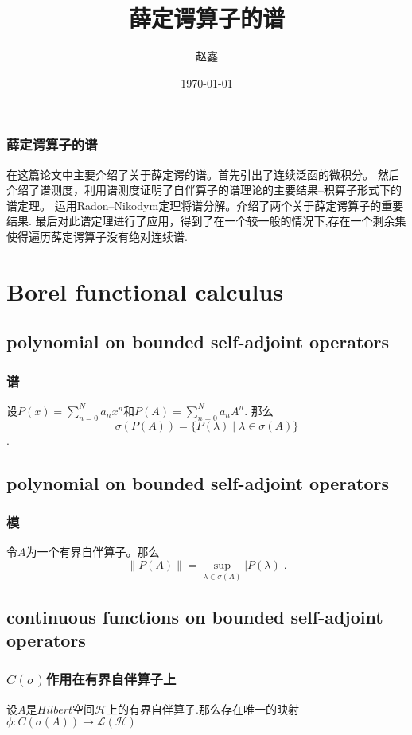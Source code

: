 \documentclass[compress,mathserif,red]{beamer}
\begin{document}
\title{薛定谔算子的谱}
\author{赵鑫}
\date{\today}



\frame{\titlepage}





\begin{frame}
\frametitle{薛定谔算子的谱}
在这篇论文中主要介绍了关于薛定谔的谱。首先引出了连续泛函的微积分。
然后介绍了谱测度，利用谱测度证明了自伴算子的谱理论的主要结果--积算子形式下的谱定理。
运用Radon–Nikodym定理将谱分解。介绍了两个关于薛定谔算子的重要结果.
最后对此谱定理进行了应用，得到了在一个较一般的情况下,存在一个剩余集使得遍历薛定谔算子没有绝对连续谱.
\end{frame}
\section{Borel functional calculus}
\subsection{polynomial on bounded self-adjoint operators}
\begin{frame}
\frametitle{谱}
\begin{corollary}
设$P(x)=\sum_{n=0}^N {a_n
x^n}$和$P(A)=\sum_{n=0}^N {a_n
 A^n}$. 那么
 $$\sigma(P(A))=\{P(\lambda) \mid \lambda \in
 \sigma(A)\}$$.
\end{corollary}
\end{frame}



\subsection{polynomial on bounded self-adjoint operators}
\begin{frame}
\frametitle{模}
\begin{corollary}
令$A$为一个有界自伴算子。那么$$\| P(A)
 \|=\sup_{\lambda \in \sigma(A)}\left| P(\lambda) \right|.$$
\end{corollary}
\end{frame}




\subsection{continuous functions on bounded self-adjoint operators}
\begin{frame}
\frametitle{$C(\sigma)$作用在有界自伴算子上}
\begin{theorem}
设$A$是$Hilbert$空间$\mathcal{H}$上的有界自伴算子.那么存在唯一的映射$\phi
 :C(\sigma (A))\rightarrow \mathcal{L}(\mathcal{H})$
\end{theorem}
\end{frame}
\end{document}
